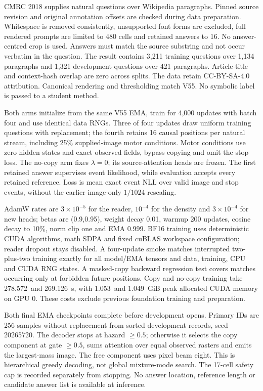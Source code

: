 \documentclass[10pt,a4paper]{article}
\newcommand{\QaSeconds}{278.572}
\newcommand{\QaMemory}{1.053}
\newcommand{\QaControlSeconds}{269.126}
\newcommand{\QaControlMemory}{1.049}
\begin{document}
CMRC 2018 supplies natural questions over Wikipedia paragraphs\cite{cmrc}.
Pinned source revision and original annotation offsets are checked during data
preparation. Whitespace is removed consistently, unsupported font forms are
excluded, full rendered prompts are limited to 480 cells and retained answers
to 16. No answer-centred crop is used. Answers must match the source substring
and not occur verbatim in the question. The result contains 3,211 training
questions over 1,134 paragraphs and 1,321 development questions over 421
paragraphs. Article-title and context-hash overlap are zero across splits.
The data retain CC-BY-SA-4.0 attribution. Canonical rendering and thresholding
match V55. No symbolic label is passed to a student method.

Both arms initialize from the same V55 EMA, train for 4,000 updates with batch
four and use identical data RNGs. Three of four updates draw uniform training
questions with replacement; the fourth retains 16 causal positions per natural
stream, including 25\% supplied-image motor conditions. Motor conditions use
zero hidden states and exact observed fields, bypass copying and omit the stop
loss. The no-copy arm fixes $\lambda=0$; its source-attention heads are frozen.
The first retained answer supervises event likelihood, while evaluation accepts
every retained reference. Loss is mean exact event NLL over valid image and
stop events, without the earlier image-only $1/1024$ rescaling.

AdamW rates are $3\times10^{-5}$ for the reader, $10^{-4}$ for the density and
$3\times10^{-4}$ for new heads; betas are (0.9,0.95), weight decay 0.01,
warmup 200 updates, cosine decay to 10\%, norm clip one and EMA 0.999. BF16
training uses deterministic CUDA algorithms, math SDPA and fixed cuBLAS
workspace configuration; reader dropout stays disabled. A four-update smoke
matches interrupted two-plus-two training exactly for all model/EMA tensors
and data, training, CPU and CUDA RNG states. A masked-copy backward regression
test covers matches occurring only at forbidden future positions. Copy and
no-copy training take \QaSeconds\ and \QaControlSeconds\ s, with
\QaMemory\ and \QaControlMemory\ GiB peak allocated CUDA memory on GPU 0.
These costs exclude previous foundation training and preparation.

Both final EMA checkpoints complete before development opens. Primary IDs are
256 samples without replacement from sorted development records, seed
20265720. The decoder stops at hazard $\geq0.5$; otherwise it selects the copy
component at gate $\geq0.5$, sums attention over equal observed rasters and
emits the largest-mass image. The free component uses pixel beam eight. This
is hierarchical greedy decoding, not global mixture-mode search. The 17-cell
safety cap is recorded separately from stopping. No answer location, reference
length or candidate answer list is available at inference.
\end{document}
